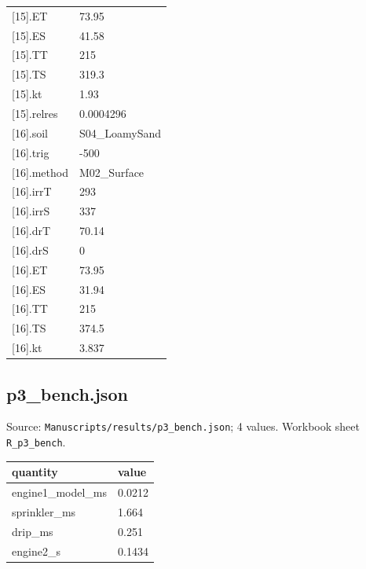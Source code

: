 {\begin{longtable}{p{}p{}}
{}[15].ET & 73.95\\
{}[15].ES & 41.58\\
{}[15].TT & 215\\
{}[15].TS & 319.3\\
{}[15].kt & 1.93\\
{}[15].relres & 0.0004296\\
{}[16].soil & S04\_LoamySand\\
{}[16].trig & -500\\
{}[16].method & M02\_Surface\\
{}[16].irrT & 293\\
{}[16].irrS & 337\\
{}[16].drT & 70.14\\
{}[16].drS & 0\\
{}[16].ET & 73.95\\
{}[16].ES & 31.94\\
{}[16].TT & 215\\
{}[16].TS & 374.5\\
{}[16].kt & 3.837\\
\bottomrule\end{longtable}}

\subsection*{p3\_bench.json}
\noindent\small Source: \nolinkurl{Manuscripts/results/p3_bench.json}; 4 values. Workbook sheet \texttt{R\_p3\_bench}.\par
{\scriptsize\begin{longtable}{p{}p{}}\toprule\textbf{quantity} & \textbf{value}\\\midrule\endhead
{}engine1\_model\_ms & 0.0212\\
{}sprinkler\_ms & 1.664\\
{}drip\_ms & 0.251\\
{}engine2\_s & 0.1434\\
\bottomrule\end{longtable}}


